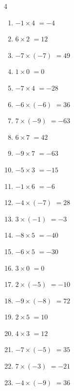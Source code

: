 \begin{multicols}{4}
\begin{enumerate}
  \item $-1\times 4$
        $=-4$

  \item $6\times 2$
        $=12$

  \item $-7\times (-7)$
        $=49$

  \item $1\times 0$
        $=0$

  \item $-7\times 4$
        $=-28$

  \item $-6\times (-6)$
        $=36$

  \item $7\times (-9)$
        $=-63$

  \item $6\times 7$
        $=42$

  \item $-9\times 7$
        $=-63$

  \item $-5\times 3$
        $=-15$

  \item $-1\times 6$
        $=-6$

  \item $-4\times (-7)$
        $=28$

  \item $3\times (-1)$
        $=-3$

  \item $-8\times 5$
        $=-40$

  \item $-6\times 5$
        $=-30$

  \item $3\times 0$
        $=0$

  \item $2\times (-5)$
        $=-10$

  \item $-9\times (-8)$
        $=72$

  \item $2\times 5$
        $=10$

  \item $4\times 3$
        $=12$

  \item $-7\times (-5)$
        $=35$

  \item $7\times (-3)$
        $=-21$

  \item $-4\times (-9)$
        $=36$


\end{enumerate}
\end{multicols}
